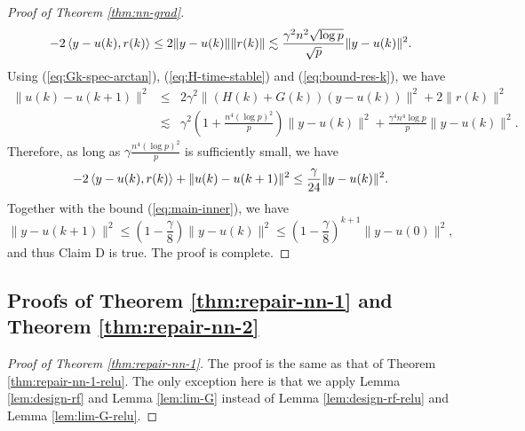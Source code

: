 \begin{proof}[Proof of Theorem \ref{thm:nn-grad}]
$$- 2\left \langle y-u(k), r(k) \right\rangle\leq 2\|y-u(k)\|\|r(k)\|\lesssim \frac{\gamma^2n^2\sqrt{\log p}}{\sqrt{p}}\|y-u(k)\|^2.$$
Using (\ref{eq:Gk-spec-arctan}), (\ref{eq:H-time-stable}) and (\ref{eq:bound-res-k}), we have
\begin{eqnarray*}
\|u(k)-u(k+1)\|^2 &\leq& 2\gamma^2\|(H(k)+G(k))(y-u(k))\|^2 + 2\|r(k)\|^2 \\
&\lesssim& \gamma^2\left(1+\frac{n^4(\log p)^2}{p}\right)\|y-u(k)\|^2 + \frac{\gamma^4n^4\log p}{p}\|y-u(k)\|^2 .
\end{eqnarray*}
Therefore, as long as $\gamma\frac{n^4(\log p)^2}{p}$ is sufficiently small, we have
$$- 2\left \langle y-u(k), r(k) \right\rangle + \|u(k)-u(k+1)\|^2 \leq \frac{\gamma}{24}\|y-u(k)\|^2.$$
Together with the bound (\ref{eq:main-inner}), we have
$$\|y-u(k+1)\|^2 \leq \left(1-\frac{\gamma}{8}\right)\|y-u(k)\|^2\leq \left(1-\frac{\gamma}{8}\right)^{k+1}\|y-u(0)\|^2,$$
and thus Claim D is true. The proof is complete.
\end{proof}


\subsection{Proofs of Theorem \ref{thm:repair-nn-1} and Theorem \ref{thm:repair-nn-2}}

\begin{proof}[Proof of Theorem \ref{thm:repair-nn-1}]
The proof is the same as that of Theorem \ref{thm:repair-nn-1-relu}. The only exception here is that we apply Lemma \ref{lem:design-rf} and Lemma \ref{lem:lim-G} instead of Lemma \ref{lem:design-rf-relu} and Lemma \ref{lem:lim-G-relu}.
\end{proof}

